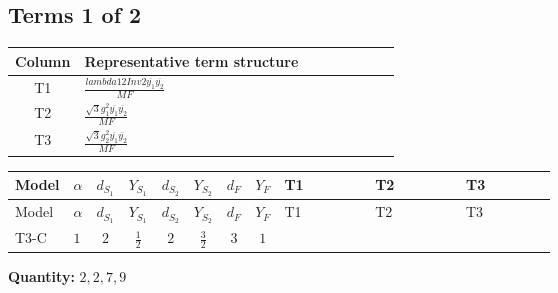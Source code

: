 \documentclass[8pt]{article}
\begin{document}
\begin{landscape}
\subsection*{Terms 1 of 2}
\begin{center}
\begin{tabular}{@{}c >{\raggedright\arraybackslash}p{0.82\linewidth}@{}}
\toprule
Column & Representative term structure \\
\midrule
T1 & \(\displaystyle \frac{lambda12Inv2 \overline{y_{1}} \overline{y_{2}}}{MF}\) \\
\midrule
T2 & \(\displaystyle \frac{\sqrt{3} g_{1}^{2} \overline{y_{1}} \overline{y_{2}}}{MF}\) \\
\midrule
T3 & \(\displaystyle \frac{\sqrt{3} g_{2}^{2} \overline{y_{1}} \overline{y_{2}}}{MF}\) \\
\midrule
\bottomrule
\end{tabular}
\end{center}
\smallskip
\tiny
\begin{longtable}{@{}llcccccc >{\raggedright\arraybackslash}p{0.21\linewidth} >{\raggedright\arraybackslash}p{0.21\linewidth} >{\raggedright\arraybackslash}p{0.21\linewidth}@{}}
\toprule
Model & $\alpha$ & $d_{S_1}$ & $Y_{S_1}$ & $d_{S_2}$ & $Y_{S_2}$ & $d_F$ & $Y_F$ & T1 & T2 & T3 \\
\midrule
\endfirsthead
\toprule
Model & $\alpha$ & $d_{S_1}$ & $Y_{S_1}$ & $d_{S_2}$ & $Y_{S_2}$ & $d_F$ & $Y_F$ & T1 & T2 & T3 \\
\midrule
\endhead
T3-C & $1$ & $2$ & $\frac{1}{2}$ & $2$ & $\frac{3}{2}$ & $3$ & $1$ & \scriptsize\adjustbox{max width=\linewidth}{$\begin{gathered} - \frac{lambda12Inv2 \overline{y_{1}} \overline{y_{2}}}{3 MF}\end{gathered}$} & \scriptsize\adjustbox{max width=\linewidth}{$\begin{gathered} - \frac{\sqrt{3} g_{1}^{2} \overline{y_{1}} \overline{y_{2}}}{2 MF}\end{gathered}$} & \scriptsize\adjustbox{max width=\linewidth}{$\begin{gathered} - \frac{\sqrt{3} g_{2}^{2} \overline{y_{1}} \overline{y_{2}}}{4 MF}\end{gathered}$} \\
\midrule
\bottomrule
\end{longtable}
\clearpage
\noindent\textbf{Quantity: }$\mathrm{2,2,7,9}$\par\smallskip

\end{landscape}
\end{document}
